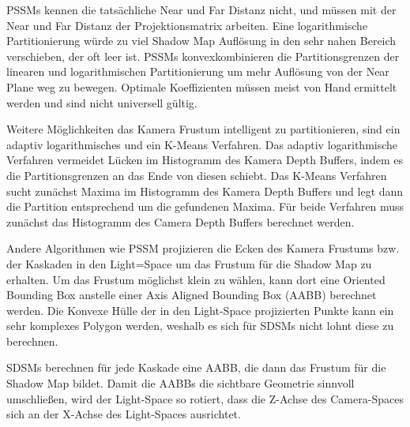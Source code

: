 \documentclass[runningheaders,a4paper]{llncs}
\begin{document}
PSSMs kennen die tatsächliche Near und Far Distanz nicht, und müssen mit der Near und Far Distanz der Projektionsmatrix arbeiten.
Eine logarithmische Partitionierung würde zu viel Shadow Map Auflösung in den sehr nahen Bereich verschieben, der oft leer ist.
PSSMs konvexkombinieren die Partitionsgrenzen der linearen und logarithmischen Partitionierung um mehr Auflösung von der Near Plane weg zu bewegen.
Optimale Koeffizienten müssen meist von Hand ermittelt werden und sind nicht universell gültig.

Weitere Möglichkeiten das Kamera Frustum intelligent zu partitionieren, sind ein adaptiv logarithmisches und ein K-Means Verfahren.
Das adaptiv logarithmische Verfahren vermeidet Lücken im Histogramm des Kamera Depth Buffers, indem es die Partitionsgrenzen an das Ende von diesen schiebt.
Das K-Means Verfahren sucht zunächst Maxima im Histogramm des Kamera Depth Buffers und legt dann die Partition entsprechend um die gefundenen Maxima.
Für beide Verfahren muss zunächst das Histogramm des Camera Depth Buffers berechnet werden.


Andere Algorithmen wie PSSM \cite{pssm} projizieren die Ecken des Kamera Frustums bzw. der Kaskaden in den Light=Space um das Frustum für die Shadow Map zu erhalten.
Um das Frustum möglichst klein zu wählen, kann dort eine Oriented Bounding Box anstelle einer Axis Aligned Bounding Box (AABB) berechnet werden.
Die Konvexe Hülle der in den Light-Space projizierten Punkte kann ein sehr komplexes Polygon werden, weshalb es sich für SDSMs nicht lohnt diese zu berechnen.

SDSMs berechnen für jede Kaskade eine AABB, die dann das Frustum für die Shadow Map bildet.
Damit die AABBs die sichtbare Geometrie sinnvoll umschließen, wird der Light-Space so rotiert, dass die Z-Achse des Camera-Spaces sich an der X-Achse des Light-Spaces ausrichtet.
\end{document}
